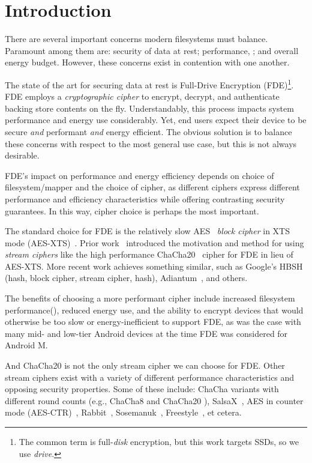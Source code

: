 \section{Introduction}\label{sec:introduction}

There are several important concerns modern filesystems must balance. Paramount
among them are: security of data at rest; performance, ; and overall energy budget. However, these concerns exist in
contention with one another.

The state of the art for securing data at rest is Full-Drive Encryption
(FDE)\footnote{The common term is full-\emph{disk} encryption, but this work
targets SSDs, so we use \emph{drive}.}. FDE employs a \emph{cryptographic
cipher} to encrypt, decrypt, and authenticate backing store contents on the fly.
Understandably, this process impacts system performance and energy use
considerably. Yet, end users expect their device to be secure \emph{and}
performant \emph{and} energy efficient. The obvious solution is to balance these
concerns with respect to the most general use case, but this is not always
desirable. 

FDE's impact on performance and energy efficiency depends on choice of
filesystem/mapper and the choice of cipher, as different ciphers express
different performance and efficiency characteristics while offering contrasting
security guarantees. In this way, cipher choice is perhaps the most important.

The standard choice for FDE is the relatively slow AES~\cite{AES} \emph{block
cipher} in XTS mode (AES-XTS)~\cite{AES-XTS}. Prior work~\cite{StrongBox}
introduced the motivation and method for using \emph{stream ciphers} like the
high performance ChaCha20~\cite{ChaCha20} cipher for FDE in lieu of AES-XTS.
More recent work achieves something similar, such as Google's HBSH~\cite{HBSH}
(hash, block cipher, stream cipher, hash), Adiantum~\cite{Adiantum}, and others.

The benefits of choosing a more performant cipher include increased filesystem
performance(), reduced energy use, and the
ability to encrypt devices that would otherwise be too slow or
energy-inefficient to support FDE, as was the case with many mid- and low-tier
Android devices at the time FDE was considered for Android M.

And ChaCha20 is not the only stream cipher we can choose for FDE. Other stream
ciphers exist with a variety of different performance characteristics and
opposing security properties. Some of these include: ChaCha variants with
different round counts (e.g., ChaCha8 \cite{ChaCha8} and ChaCha20
\cite{ChaCha20}), SalsaX~\cite{SalsaX}, AES in counter mode
(AES-CTR)~\cite{AES-CTR}, Rabbit~\cite{Rabbit}, Sosemanuk~\cite{Sosemanuk},
Freestyle~\cite{Freestyle}, et cetera.

